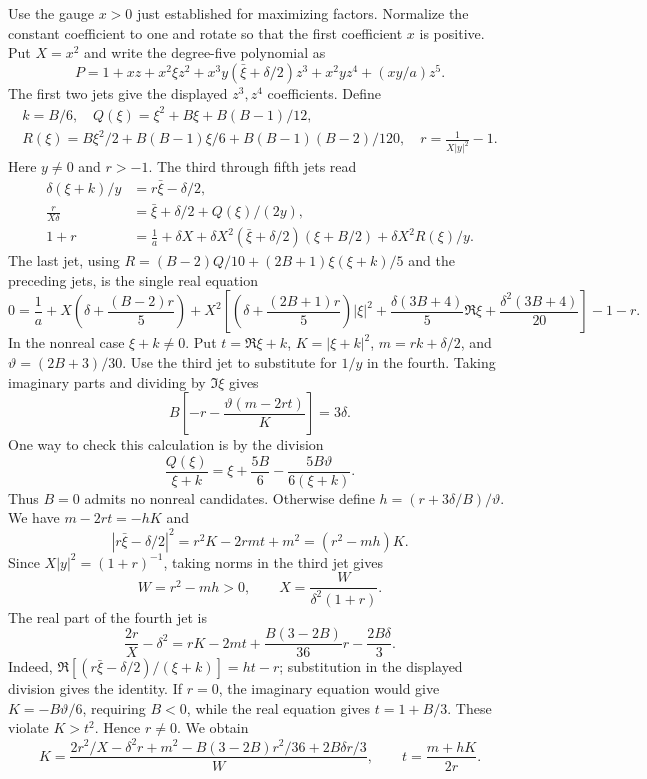 \documentclass[11pt]{article}
\begin{document}
Use the gauge \(x>0\) just established for maximizing factors. Normalize the constant coefficient to one and
rotate so that the first coefficient \(x\) is positive. Put
\(X=x^2\) and write the degree-five polynomial as
\[
 P=1+xz+x^2\xi z^2+x^3y(\bar\xi+\delta/2)z^3+
           x^2yz^4+(xy/a)z^5 .
\]
The first two jets give the displayed \(z^3,z^4\) coefficients.
Define
\[
 \begin{gathered}k=B/6,\quad Q(\xi)=\xi^2+B\xi+B(B-1)/12,\\
 R(\xi)=B\xi^2/2+B(B-1)\xi/6+B(B-1)(B-2)/120,\quad r=\frac1{X|y|^2}-1.\end{gathered}
\]
Here \(y\ne0\) and \(r>-1\). The third through fifth jets read
\begin{align*}
 \delta(\xi+k)/y&=r\bar\xi-\delta/2,\\
 \frac{r}{X\delta}&=\bar\xi+\delta/2+Q(\xi)/(2y),\\
 1+r&=\frac1a+\delta X+
    \delta X^2(\bar\xi+\delta/2)(\xi+B/2)+\delta X^2R(\xi)/y.
\end{align*}
The last jet, using
\(R=(B-2)Q/10+(2B+1)\xi(\xi+k)/5\) and the preceding jets, is
the single real equation
\begin{equation}\label{eq:c5-missing-fifth-real}
 0=\frac1a+X\!\left(\delta+\frac{(B-2)r}{5}\right)
  +X^2\left[\left(\delta+\frac{(2B+1)r}{5}\right)|\xi|^2+
       \frac{\delta(3B+4)}5\Re\xi+\frac{\delta^2(3B+4)}{20}\right]
  -1-r .
\end{equation}
In the nonreal case \(\xi+k\ne0\). Put \(t=\Re\xi+k\),
\(K=|\xi+k|^2\), \(m=rk+\delta/2\), and \(\vartheta=(2B+3)/30\).
Use the third jet to substitute for \(1/y\) in the fourth.
Taking imaginary parts and dividing by \(\Im\xi\) gives
\[
 B\left[-r-\frac{\vartheta(m-2rt)}K\right]=3\delta .
\]
One way to check this calculation is by the division
\[
 \frac{Q(\xi)}{\xi+k}=\xi+\frac{5B}{6}
                        -\frac{5B\vartheta}{6(\xi+k)}.
\]
Thus \(B=0\) admits no nonreal candidates. Otherwise define
\(h=(r+3\delta/B)/\vartheta\). We have \(m-2rt=-hK\) and
\[
 |r\bar\xi-\delta/2|^2=r^2K-2rmt+m^2=(r^2-mh)K.
\]
Since \(X|y|^2=(1+r)^{-1}\), taking norms in the third jet gives
\[
 W=r^2-mh>0,\qquad X=\frac{W}{\delta^2(1+r)}.
\]
The real part of the fourth jet is
\[
 \frac{2r}{X}-\delta^2=rK-2mt+\frac{B(3-2B)}{36}r-\frac{2B\delta}3.
\]
Indeed, \(\Re[(r\bar\xi-\delta/2)/(\xi+k)]=ht-r\);
substitution in the displayed division gives the identity.
If \(r=0\), the imaginary equation would give \(K=-B\vartheta/6\),
requiring \(B<0\), while the real equation gives \(t=1+B/3\).
These violate \(K>t^2\). Hence \(r\ne0\). We obtain
\begin{equation}\label{eq:c5-nonreal-reconstruct}
 K=\frac{2r^2/X-\delta^2r+m^2-B(3-2B)r^2/36+2B\delta r/3}{W},
 \qquad t=\frac{m+hK}{2r}.
\end{equation}
\end{document}
